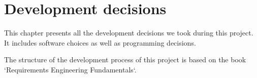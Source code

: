 \chapter{Development decisions}\label{ch:dev_dec}

This chapter presents all the development decisions we took during this
project. It includes software choices as well as programming decisions.

The structure of the development process of this project is based on the book
`Requirements Engineering Fundamentals`\cite{pohl2011requirements}.
















